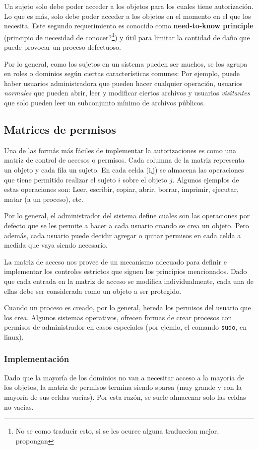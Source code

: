 Un sujeto solo debe poder acceder a los objetos para los cuales tiene autorización. Lo que es más, solo debe poder acceder a los objetos en el momento en el que los necesita. Este segundo requerimiento es conocido como \textbf{need-to-know principle} (principio de necesidad de conocer?\footnote{No se como traducir esto, si se les ocuree alguna traduccion mejor, propongan}) y útil para limitar la cantidad de daño que puede provocar un proceso defectuoso.

Por lo general, como los sujetos en un sistema pueden ser muchos, se los agrupa en roles o dominios según ciertas características comunes: Por ejemplo, puede haber usuarios administradora que pueden hacer cualquier operación, usuarios \textit{normales} que pueden abrir, leer y modificar ciertos archivos y usuarios \textit{visitantes} que solo pueden leer un subconjunto mínimo de archivos públicos.

\subsection{Matrices de permisos}
Una de las formás más fáciles de implementar la autorizaciones es como una matriz de control de accesos o permisos. Cada columna de la matriz representa un objeto y cada fila un sujeto. En cada celda (i,j) se almacena las operaciones que tiene permitido realizar el sujeto $i$ sobre el objeto $j$. Algunos ejemplos de estas operaciones son: Leer, escribir, copiar, abrir, borrar, imprimir, ejecutar, matar (a un proceso), etc.

Por lo general, el administrador del sistema define cuales son las operaciones por defecto que se les permite a hacer a cada usuario cuando se crea un objeto. Pero además, cada usuario puede decidir agregar o quitar permisos en cada celda a medida que vaya siendo necesario. 

La matriz de acceso nos provee de un mecanismo adecuado para definir e implementar los controles estrictos que siguen los principios mencionados. Dado que cada entrada en la matriz de acceso se modifica individualmente, cada una de ellas debe ser considerada como un objeto a ser protegido.

Cuando un proceso es creado, por lo general, hereda los permisos del usuario que los crea. Algunos sistemas operativos, ofrecen formas de crear procesos con permisos de administrador en casos especiales (por ejemlo, el comando \texttt{sudo}, en linux).

\subsubsection{Implementación} 
Dado que la mayoría de los dominios no van a necesitar acceso a la mayoría de los objetos, la matriz de permisos termina siendo sparsa (muy grande y con la mayoría de sus celdas vacías). Por esta razón, se suele almacenar solo las celdas no vacías.

